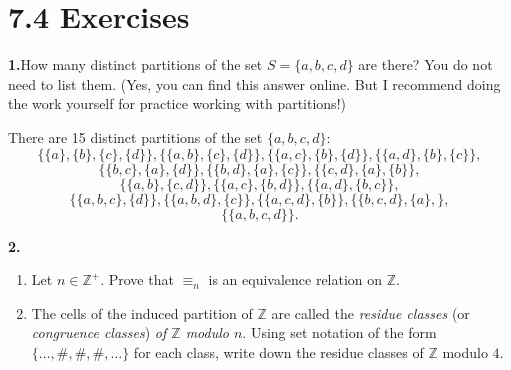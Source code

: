 \documentclass[10pt,]{book}
\theoremstyle{plain}
\theoremstyle{definition}
\theoremstyle{definition}
\theoremstyle{definition}
\theoremstyle{definition}
\numberwithin{equation}{section}
\def\Z{\mathbb{Z}}
\begin{document}
\section*{7.4 Exercises}
\noindent\textbf{1.}\quad{}How many distinct partitions of the set \(S=\{a,b,c,d\}\) are there? You do not need to list them. (Yes, you can find this answer online. But I recommend doing the work yourself for practice working with partitions!)%
\par\smallskip
There are 15 distinct partitions of the set \(\{a,b,c,d\}\):%
\begin{equation*}
\{\{a\},\{b\},\{c\},\{d\}\}, \{\{a,b\},\{c\},\{d\}\},\{\{a,c\},\{b\},\{d\}\},\{\{a,d\},\{b\},\{c\}\},
\end{equation*}
%
\begin{equation*}
\{\{b,c\},\{a\},\{d\}\},\{\{b,d\},\{a\},\{c\}\},\{\{c,d\},\{a\},\{b\}\},
\end{equation*}
%
\begin{equation*}
\{\{a,b\},\{c,d\}\},
\{\{a,c\},\{b,d\}\},\{\{a,d\},\{b,c\}\},
\end{equation*}
%
\begin{equation*}
\{\{a,b,c\},\{d\}\},\{\{a,b,d\},\{c\}\},\{\{a,c,d\},\{b\}\},\{\{b,c,d\},\{a\},\},
\end{equation*}
%
%
\begin{equation*}
\{\{a,b,c,d\}\}.
\end{equation*}
\par\smallskip
\noindent\textbf{2.}\quad{}\leavevmode%
\begin{enumerate}[label=(\alph*)]
\item\hypertarget{li-419}{}Let  \(n\in \Z^+\). Prove that  \(\equiv_n\) is an equivalence relation on \(\Z\).%
\item\hypertarget{li-420}{}The cells of the induced partition of \(\Z\) are called the \emph{residue classes} (or \emph{congruence classes}) \emph{of \(\Z\) modulo \(n\)}.  Using set notation of the form \(\{\ldots,\#, \#,\#,\ldots\}\) for each class, write down the residue classes of \(\Z\) modulo \(4\).%
\end{enumerate}
\par\smallskip
\leavevmode%
\end{document}
